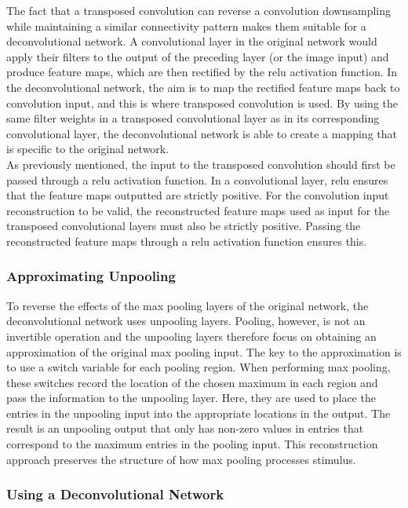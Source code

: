 The fact that a transposed convolution can reverse a convolution downsampling while maintaining a similar connectivity pattern makes them suitable for a deconvolutional network. A convolutional layer in the original network would apply their filters to the output of the preceding layer (or the image input) and produce feature maps, which are then rectified by the \acrshort{relu} activation function. In the deconvolutional network, the aim is to map the rectified feature maps back to convolution input, and this is where transposed convolution is used. By using the same filter weights in a transposed convolutional layer as in its corresponding convolutional layer, the deconvolutional network is able to create a mapping that is specific to the original network. \\

\noindent As previously mentioned, the input to the transposed convolution should first be passed through a \acrshort{relu} activation function. In a convolutional layer, \acrshort{relu} ensures that the feature maps outputted are strictly positive. For the convolution input reconstruction to be valid, the reconstructed feature maps used as input for the transposed convolutional layers must also be strictly positive. Passing the reconstructed feature maps through a \acrshort{relu} activation function ensures this.

\subsubsection{Approximating Unpooling} \label{sec:unpool-theory}

To reverse the effects of the max pooling layers of the original network, the deconvolutional network uses unpooling layers. Pooling, however, is not an invertible operation and the unpooling layers therefore focus on obtaining an approximation of the original max pooling input. The key to the approximation is to use a switch variable for each pooling region. When performing max pooling, these switches record the location of the chosen maximum in each region and pass the information to the unpooling layer. Here, they are used to place the entries in the unpooling input into the appropriate locations in the output. The result is an unpooling output that only has non-zero values in entries that correspond to the maximum entries in the pooling input. This reconstruction approach preserves the structure of how max pooling processes stimulus. 

\subsubsection{Using a Deconvolutional Network}

